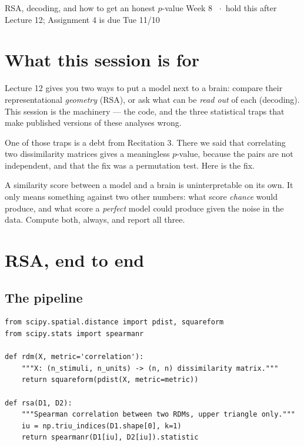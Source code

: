 \documentclass[11pt]{article}
\begin{document}
  {RSA, decoding, and how to get an honest $p$-value}
  {Week 8 \ $\cdot$\ hold this after Lecture 12; Assignment 4 is due Tue 11/10}

\section*{What this session is for}

Lecture 12 gives you two ways to put a model next to a brain: compare their
representational \emph{geometry} (RSA), or ask what can be \emph{read out} of
each (decoding). This session is the machinery --- the code, and the three
statistical traps that make published versions of these analyses wrong.

One of those traps is a debt from Recitation 3. There we said that correlating
two dissimilarity matrices gives a meaningless $p$-value, because the pairs are
not independent, and that the fix was a permutation test. Here is the fix.

\begin{keybox}
 A similarity score between a model and a brain is
uninterpretable on its own. It only means something against two other numbers:
what score \emph{chance} would produce, and what score a \emph{perfect} model
could produce given the noise in the data. Compute both, always, and report all
three.
\end{keybox}

\section{RSA, end to end}

\subsection{The pipeline}

\begin{lstlisting}
from scipy.spatial.distance import pdist, squareform
from scipy.stats import spearmanr

def rdm(X, metric='correlation'):
    """X: (n_stimuli, n_units) -> (n, n) dissimilarity matrix."""
    return squareform(pdist(X, metric=metric))

def rsa(D1, D2):
    """Spearman correlation between two RDMs, upper triangle only."""
    iu = np.triu_indices(D1.shape[0], k=1)
    return spearmanr(D1[iu], D2[iu]).statistic
\end{lstlisting}
\end{document}
